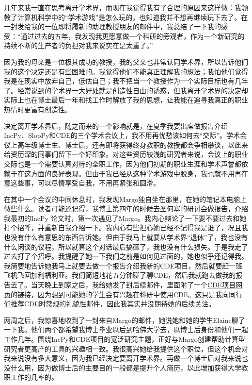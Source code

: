 \documentclass[letter,12pt]{book}
\begin{document}
\begin{CJK}{UTF8}{gbsn}
几年来我一直在思考离开学术界，而现在我觉得我有了合理的原因来这样做：我领教了计算机科学中的“学术游戏”是怎么玩的，也知道我并不想再继续玩下去了。在一封发给我的一位即将履新的助理教授朋友的邮件中，我总结了一下我的感受：“通过过去的五年，我发现我更愿意做一个科研的旁观者，作为一个新研究的持续不断的生产者的负担对我来说实在是太重了。”

因为我的母亲是一位极其成功的教授，我的父亲也非常认同学术界，所以告诉他们我的这个决定还是有些困难的。我觉得他们不能真正理解我的想法；我怕他们觉得我是在现实中放弃自己，低估自己；我不把当一个教授作为一个实际目标也有几年了。经常说到的学术界一大好处就是创造性自由的诱惑，但我离开学术界的决定却实际上也在博士最后一年和找工作时解放了我的思想，让我能在追寻我真正的职业热情时更富有创造性。

\breakline

决定离开学术界后，随之而来的一个影响就是，在夏季我要出席做报告介绍IncPy、SlopPy和CDE的三个学术会议上，我不用再忧愁该如何去“交际”。学术会议上高年级博士生、博士后，还有即将获得终身教职的教授都会争相攀谈，以此来给资历深的同事们留下一个好印象。对这些资历较浅的研究者来说，会议上的职业交际也是一个需要认真对待的全职工作，因为他们初期的职业生涯和学术声誉都依赖于在这方面的良好表现。但由于我已经从这种学术游戏中脱身，我也就不用再在意这些事，可以尽情享受自我，不用再紧张和圆滑。

在其中一个会议的中间休息时，我发现Margo独自坐在那里，在她的笔记本电脑上做些什么。读者可能还记得，我博士第四年的时候去圣何塞的研讨会做报告，介绍我最初的IncPy 论文时，第一次遇见了Margo。我内心辩论了一下要不要过去和她打个招呼，并重新自我介绍一下。我内心有些担心她已经不记得我是谁了，况且我也没有什么有意思的东西告诉她。但由于我马上就要从学术界“退休”了，我也没有什么闲谈的议程，所以就算这个对话最后搞砸了，我也没有什么损失。于是我走了过去打了个招呼。我提醒了她一下我们之前是如何见过面的，她也似乎还记得我。我简要地告诉她我马上就要去做一个报告介绍我新的CDE项目，然后就要赶一班飞机飞回加利福利亚。我们简短地花五分钟聊了聊CDE，然后我就跑去做我的报告去了。当天晚上到家之后，我给她发了封后续邮件，里面附了一个\href{http://www.pgbovine.net/cde.html}{CDE项目网页}的链接，因为想到可能她的学生会有兴趣在科研中使用CDE。这只是我向同行们推荐CDE时常规的礼貌性邮件，因此我其实并没期待她的后续关注。

两周之后，我惊喜地收到了一封来自Margo的邮件，她说她和她的学生Elaine聊了一下我。他们两个都希望我博士毕业以后到哈佛大学去，以博士后身份和他们一起工作几年。围绕IncPy和CDE项目的宽泛研究主题，正好与Margo创建帮助计算型研究者更高产的工具的兴趣相一致。我很高兴她给我提供这个职位，但这个机会对我来说没有多大意义，因为我已经决定要离开学术界。再做一个博士后对我来说也没什么用，因为做博士后的主要目的一般都是提升个人简历，以此增加获得大学教职工作的几率的。


\end{CJK}
\end{document}
